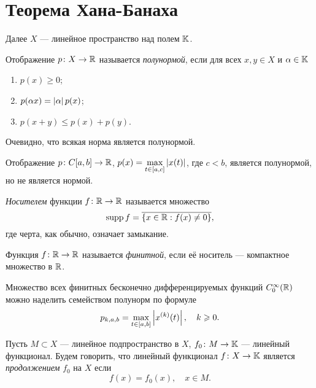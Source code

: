 \section{Теорема Хана-Банаха}
Далее $X$ --- линейное пространство над полем $\mathbb{K}$.

\begin{definition}
    Отображение $p \colon X \to \mathbb{R}$ называется \emph{полунормой}, если
    для всех $x, y \in X$ и $\alpha \in \mathbb{K}$
    \begin{enumerate}
        \item $p(x) \geq 0$;
        \item $p(\alpha x) = \left|\alpha\right|p(x)$;
        \item $p(x + y) \leq p(x) + p(y)$.
    \end{enumerate}
\end{definition}

Очевидно, что всякая норма является полунормой.

\begin{example}
    Отображение $p \colon C[a, b] \to \mathbb{R}$, 
    $p(x) = \max\limits_{t \in [a, c]} \left|x(t)\right|$, 
    где $c < b$, является полунормой, но не является нормой.
\end{example}

\begin{definition}
    \emph{Носителем} функции $f \colon \mathbb{R} \to \mathbb{R}$ называется множество
    \[ \operatorname{supp} f = \overline{\left\{x \in \mathbb{R} : f(x) \neq 0\right\}}, \]
    где черта, как обычно, означает замыкание.
\end{definition}

\begin{definition}
    Функция $f \colon \mathbb{R} \to \mathbb{R}$ называется \emph{финитной}, 
    если её носитель --- компактное множество в $\mathbb{R}$.
\end{definition}

\begin{example}
    Множество всех финитных бесконечно дифференцируемых функций 
    $C_0^\infty(\mathbb{R})$ можно наделить семейством полунорм
    по формуле
    \[ p_{k,a,b} = \max_{t \in [a,b]} \left|x^{(k)}(t)\right|, \quad k \geqslant 0. \]    
\end{example}

\begin{definition}
    Пусть $M \subset X$ --- линейное подпространство в $X$, $f_0 \colon M \hm\to \fieldk$ --- 
    линейный функционал. Будем говорить, что линейный функционал $f \colon X \to \mathbb{K}$
    является \emph{продолжением} $f_0$ на $X$ если
    \[ f(x) = f_0(x), \quad x \in M. \]
\end{definition}

